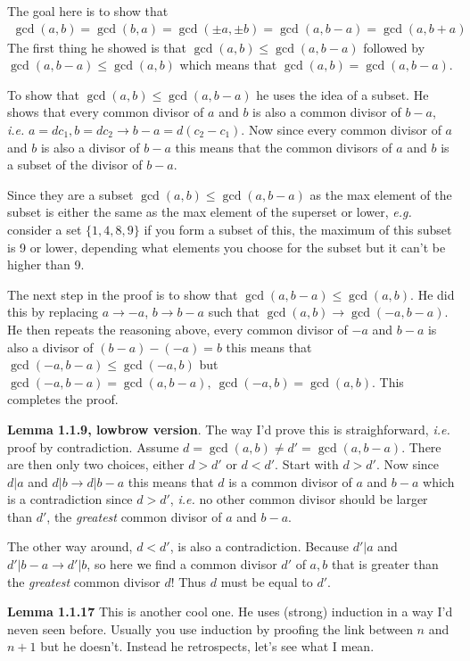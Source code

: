 \documentclass[aps,preprint,preprintnumbers,nofootinbib,showpacs,prd]{revtex4-1}
\newcommand{\ie}{{\it i.e.} }
\newcommand{\eg}{{\it e.g.} }
\newcommand{\nbea}{\begin{eqnarray*}}
\newcommand{\neea}{\end{eqnarray*}}
\begin{document}
The goal here is to show that 
%
\nbea
\gcd(a,b) = \gcd(b,a) = \gcd(\pm a,\pm b) = \gcd(a,b-a) = \gcd(a,b+a)
\neea
%
The first thing he showed is that $\gcd(a,b) \le \gcd(a,b-a)$ followed by $\gcd(a,b-a) \le \gcd(a,b)$ which means that $\gcd(a,b) = \gcd(a,b-a)$.

To show that $\gcd(a,b) \le \gcd(a,b-a)$ he uses the idea of a subset. He shows that every common divisor of $a$ and $b$ is also a common divisor of $b-a$, \ie $a = d c_1, b=d c_2 \to b-a = d(c_2-c_1)$. Now since every common divisor of $a$ and $b$ is also a divisor of $b-a$ this means that the common divisors of $a$ and $b$ is a subset of the divisor of $b-a$.

Since they are a subset $\gcd(a,b) \le \gcd(a,b-a)$ as the max element of the subset is either the same as the max element of the superset or lower, \eg consider a set $\{1,4,8,9\}$ if you form a subset of this, the maximum of this subset is 9 or lower, depending what elements you choose for the subset but it can't be higher than 9.

The next step in the proof is to show that $\gcd(a,b-a) \le \gcd(a,b)$. He did this by replacing $a \to -a$, $b \to b-a$ such that $\gcd(a,b) \to \gcd(-a, b-a)$. He then repeats the reasoning above, every common divisor of $-a$ and $b-a$ is also a divisor of $(b-a) - (-a) = b$ this means that $\gcd(-a,b-a) \le \gcd(-a,b)$ but $\gcd(-a,b-a) = \gcd(a, b-a),~\gcd(-a,b) = \gcd(a,b)$. This completes the proof.

{\bf Lemma 1.1.9, lowbrow version}. The way I'd prove this is straighforward, \ie proof by contradiction. Assume $d = \gcd(a,b) \neq d' = \gcd(a, b-a)$. There are then only two choices, either $d > d'$ or $d < d'$. Start with $d > d'$. Now since $d|a$ and $d|b \to d | b-a$ this means that $d$ is a common divisor of $a$ and $b-a$ which is a contradiction since $d > d'$, \ie no other common divisor should be larger than $d'$, the {\it greatest} common divisor of $a$ and $b-a$.

The other way around, $d < d'$, is also a contradiction. Because $d'|a$ and $d'|b-a \to d'|b$, so here we find a common divisor $d'$ of $a,b$ that is greater than the {\it greatest} common divisor $d$! Thus $d$ must be equal to $d'$.

{\bf Lemma 1.1.17} This is another cool one. He uses (strong) induction in a way I'd neven seen before. Usually you use induction by proofing the link between $n$ and $n+1$ but he doesn't. Instead he retrospects, let's see what I mean.
\end{document}
